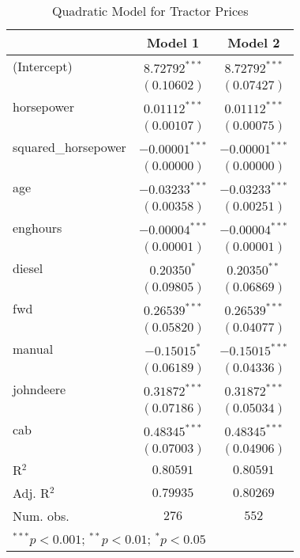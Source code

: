 
\begin{table}
\begin{center}
\begin{tabular}{l c c}
\hline
 & Model 1 & Model 2 \\
\hline
(Intercept)         & $8.72792^{***}$  & $8.72792^{***}$  \\
                    & $(0.10602)$      & $(0.07427)$      \\
horsepower          & $0.01112^{***}$  & $0.01112^{***}$  \\
                    & $(0.00107)$      & $(0.00075)$      \\
squared\_horsepower & $-0.00001^{***}$ & $-0.00001^{***}$ \\
                    & $(0.00000)$      & $(0.00000)$      \\
age                 & $-0.03233^{***}$ & $-0.03233^{***}$ \\
                    & $(0.00358)$      & $(0.00251)$      \\
enghours            & $-0.00004^{***}$ & $-0.00004^{***}$ \\
                    & $(0.00001)$      & $(0.00001)$      \\
diesel              & $0.20350^{*}$    & $0.20350^{**}$   \\
                    & $(0.09805)$      & $(0.06869)$      \\
fwd                 & $0.26539^{***}$  & $0.26539^{***}$  \\
                    & $(0.05820)$      & $(0.04077)$      \\
manual              & $-0.15015^{*}$   & $-0.15015^{***}$ \\
                    & $(0.06189)$      & $(0.04336)$      \\
johndeere           & $0.31872^{***}$  & $0.31872^{***}$  \\
                    & $(0.07186)$      & $(0.05034)$      \\
cab                 & $0.48345^{***}$  & $0.48345^{***}$  \\
                    & $(0.07003)$      & $(0.04906)$      \\
\hline
R$^2$               & $0.80591$        & $0.80591$        \\
Adj. R$^2$          & $0.79935$        & $0.80269$        \\
Num. obs.           & $276$            & $552$            \\
\hline
\multicolumn{3}{l}{\scriptsize{$^{***}p<0.001$; $^{**}p<0.01$; $^{*}p<0.05$}}
\end{tabular}
\caption{Quadratic Model for Tractor Prices}
\label{tab:reg_sq_horse}
\end{center}
\end{table}
